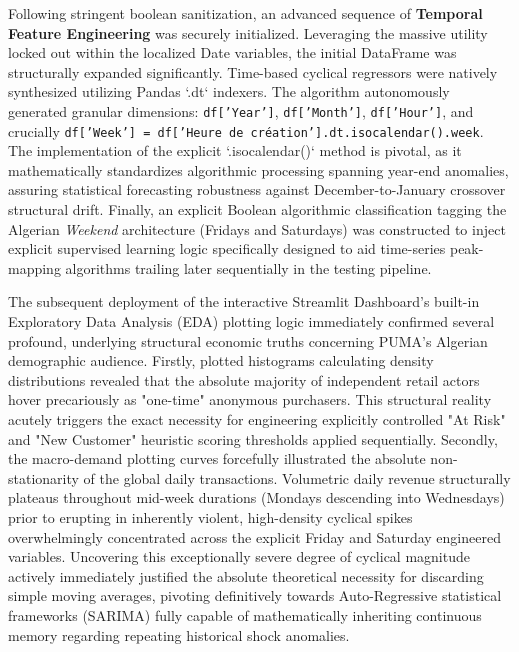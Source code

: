 \documentclass[12pt,a4paper]{report}
\begin{document}
Following stringent boolean sanitization, an advanced sequence of \textbf{Temporal Feature Engineering} was securely initialized. Leveraging the massive utility locked out within the localized Date variables, the initial DataFrame was structurally expanded significantly. Time-based cyclical regressors were natively synthesized utilizing Pandas `.dt` indexers. The algorithm autonomously generated granular dimensions: \texttt{df['Year']}, \texttt{df['Month']}, \texttt{df['Hour']}, and crucially \texttt{df['Week'] = df['Heure de création'].dt.isocalendar().week}. The implementation of the explicit `.isocalendar()` method is pivotal, as it mathematically standardizes algorithmic processing spanning year-end anomalies, assuring statistical forecasting robustness against December-to-January crossover structural drift. Finally, an explicit Boolean algorithmic classification tagging the Algerian \textit{Weekend} architecture (Fridays and Saturdays) was constructed to inject explicit supervised learning logic specifically designed to aid time-series peak-mapping algorithms trailing later sequentially in the testing pipeline.

The subsequent deployment of the interactive Streamlit Dashboard's built-in Exploratory Data Analysis (EDA) plotting logic immediately confirmed several profound, underlying structural economic truths concerning PUMA's Algerian demographic audience. Firstly, plotted histograms calculating density distributions revealed that the absolute majority of independent retail actors hover precariously as "one-time" anonymous purchasers. This structural reality acutely triggers the exact necessity for engineering explicitly controlled "At Risk" and "New Customer" heuristic scoring thresholds applied sequentially. Secondly, the macro-demand plotting curves forcefully illustrated the absolute non-stationarity of the global daily transactions. Volumetric daily revenue structurally plateaus throughout mid-week durations (Mondays descending into Wednesdays) prior to erupting in inherently violent, high-density cyclical spikes overwhelmingly concentrated across the explicit Friday and Saturday engineered variables. Uncovering this exceptionally severe degree of cyclical magnitude actively immediately justified the absolute theoretical necessity for discarding simple moving averages, pivoting definitively towards Auto-Regressive statistical frameworks (SARIMA) fully capable of mathematically inheriting continuous memory regarding repeating historical shock anomalies.
\end{document}
